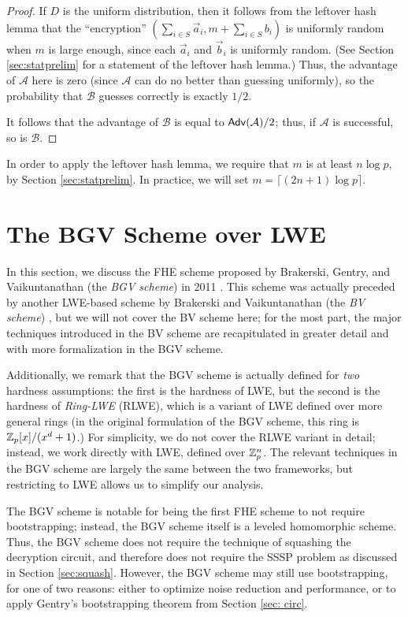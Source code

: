 \begin{proof}
    If $D$ is the uniform distribution, then it follows from the leftover hash lemma that the ``encryption'' $(\sum_{i \in S} \vec{a}_i, m + \sum_{i \in S} b_i)$ is uniformly random when $m$ is large enough, since each $\vec{a}_i$ and $\vec{b}_i$ is uniformly random. (See Section \ref{sec:statprelim} for a statement of the leftover hash lemma.) Thus, the advantage of $\mathcal{A}$ here is zero (since $\mathcal{A}$ can do no better than guessing uniformly), so the probability that $\mathcal{B}$ guesses correctly is exactly $1/2$.

    It follows that the advantage of $\mathcal{B}$ is equal to ${\sf Adv}(\mathcal{A}) / 2$; thus, if $\mathcal{A}$ is successful, so is $\mathcal{B}$.

    \end{proof}

    In order to apply the leftover hash lemma, we require that $m$ is at least $n \log p$, by Section \ref{sec:statprelim}. In practice, we will set $m = \lceil (2n+1) \log p \rceil$.


\section{The BGV Scheme over LWE} \label{sec:bvbgv}
    In this section, we discuss the FHE scheme proposed by Brakerski, Gentry, and Vaikuntanathan (the \emph{BGV scheme}) in 2011 \cite{bgv2011}. This scheme was actually preceded by another LWE-based scheme by Brakerski and Vaikuntanathan (the \emph{BV scheme}) \cite{bv2011}, but we will not cover the BV scheme here; for the most part, the major techniques introduced in the BV scheme are recapitulated in greater detail and with more formalization in the BGV scheme.

    Additionally, we remark that the BGV scheme is actually defined for \emph{two} hardness assumptions: the first is the hardness of LWE, but the second is the hardness of \emph{Ring-LWE} (RLWE), which is a variant of LWE defined over more general rings (in the original formulation of the BGV scheme, this ring is $\mathbb{Z}_p[x] / (x^d + 1)$.) For simplicity, we do not cover the RLWE variant in detail; instead, we work directly with LWE, defined over $\mathbb{Z}_p^n$. The relevant techniques in the BGV scheme are largely the same between the two frameworks, but restricting to LWE allows us to simplify our analysis.

    The BGV scheme is notable for being the first FHE scheme to not require bootstrapping; instead, the BGV scheme itself is a leveled homomorphic scheme. Thus, the BGV scheme does not require the technique of squashing the decryption circuit, and therefore does not require the SSSP problem as discussed in Section \ref{sec:squash}. However, the BGV scheme may still use bootstrapping, for one of two reasons: either to optimize noise reduction and performance, or to apply Gentry's bootstrapping theorem from Section \ref{sec: circ}.

